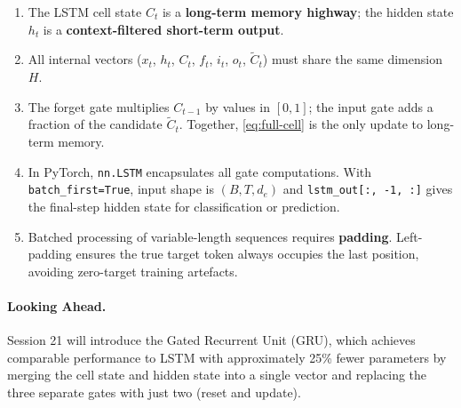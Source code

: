 \documentclass[12pt,a4paper]{article}
\begin{document}
\begin{keyinsight}[title=Core Takeaways from Session 20]
\begin{enumerate}[label=\arabic*.]
  \item The LSTM cell state $C_t$ is a \textbf{long-term memory highway};
    the hidden state $h_t$ is a \textbf{context-filtered short-term output}.
  \item All internal vectors ($x_t$, $h_t$, $C_t$, $f_t$, $i_t$, $o_t$,
    $\tilde{C}_t$) must share the same dimension $H$.
  \item The forget gate multiplies $C_{t-1}$ by values in $[0,1]$;
    the input gate adds a fraction of the candidate $\tilde{C}_t$.
    Together, \cref{eq:full-cell} is the only update to long-term memory.
  \item In PyTorch, \texttt{nn.LSTM} encapsulates all gate computations.
    With \texttt{batch\_first=True}, input shape is
    $(B, T, d_e)$ and \texttt{lstm\_out[:, -1, :]} gives the final-step
    hidden state for classification or prediction.
  \item Batched processing of variable-length sequences requires
    \textbf{padding}.  Left-padding ensures the true target token always
    occupies the last position, avoiding zero-target training artefacts.
\end{enumerate}
\end{keyinsight}

\paragraph{Looking Ahead.}
Session 21 will introduce the Gated Recurrent Unit (GRU), which achieves
comparable performance to LSTM with approximately 25\% fewer parameters by
merging the cell state and hidden state into a single vector and replacing
the three separate gates with just two (reset and update).

\clearpage
\end{document}
